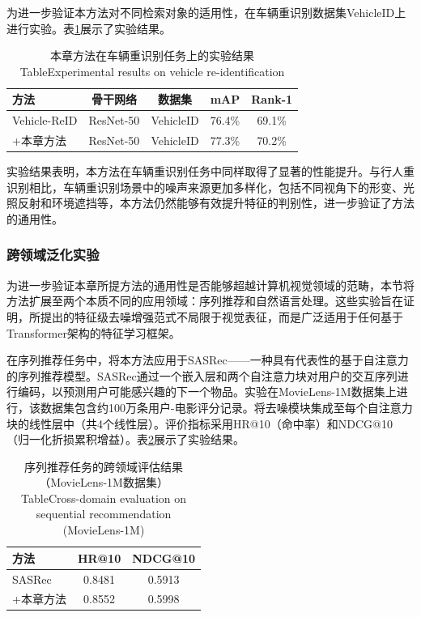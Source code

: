 为进一步验证本方法对不同检索对象的适用性，在车辆重识别数据集VehicleID\cite{liu2016deep}上进行实验。表\ref{tab:chap4_vehicle}展示了实验结果。

\begin{table}[htbp]
\centering
\caption{本章方法在车辆重识别任务上的实验结果\protect\\[-2pt]{\rm Table\;\thetable\quad Experimental results on vehicle re-identification}}\label{tab:chap4_vehicle}
\vspace{0.2cm}
\renewcommand{\arraystretch}{1.2}
\begin{tabular}{l|c|c|cc}
\hline\hline
方法 & 骨干网络 & 数据集 & mAP & Rank-1 \\
\hline
Vehicle-ReID\cite{chu2019vehicle} & ResNet-50 & VehicleID & 76.4\% & 69.1\% \\
+本章方法 & ResNet-50 & VehicleID & 77.3\% & 70.2\% \\
\hline\hline
\end{tabular}
\end{table}

实验结果表明，本方法在车辆重识别任务中同样取得了显著的性能提升。与行人重识别相比，车辆重识别场景中的噪声来源更加多样化，包括不同视角下的形变、光照反射和环境遮挡等，本方法仍然能够有效提升特征的判别性，进一步验证了方法的通用性。

\subsubsection{跨领域泛化实验}

为进一步验证本章所提方法的通用性是否能够超越计算机视觉领域的范畴，本节将方法扩展至两个本质不同的应用领域：序列推荐和自然语言处理。这些实验旨在证明，所提出的特征级去噪增强范式不局限于视觉表征，而是广泛适用于任何基于Transformer架构的特征学习框架。

在序列推荐任务中，将本方法应用于SASRec\cite{kang2018self}——一种具有代表性的基于自注意力的序列推荐模型。SASRec通过一个嵌入层和两个自注意力块对用户的交互序列进行编码，以预测用户可能感兴趣的下一个物品。实验在MovieLens-1M\cite{harper2015movielens}数据集上进行，该数据集包含约100万条用户-电影评分记录。将去噪模块集成至每个自注意力块的线性层中（共4个线性层）。评价指标采用HR@10（命中率）和NDCG@10（归一化折损累积增益）。表\ref{tab:chap4_rec}展示了实验结果。

\begin{table}[htbp]
\centering
\caption{序列推荐任务的跨领域评估结果（MovieLens-1M数据集）\protect\\[-2pt]{\rm Table\;\thetable\quad Cross-domain evaluation on sequential recommendation (MovieLens-1M)}}\label{tab:chap4_rec}
\vspace{0.2cm}
\renewcommand{\arraystretch}{1.2}
\begin{tabular}{l|cc}
\hline\hline
方法 & HR@10 & NDCG@10 \\
\hline
SASRec\cite{kang2018self} & 0.8481 & 0.5913 \\
+本章方法 & 0.8552 & 0.5998 \\
\hline\hline
\end{tabular}
\end{table}


